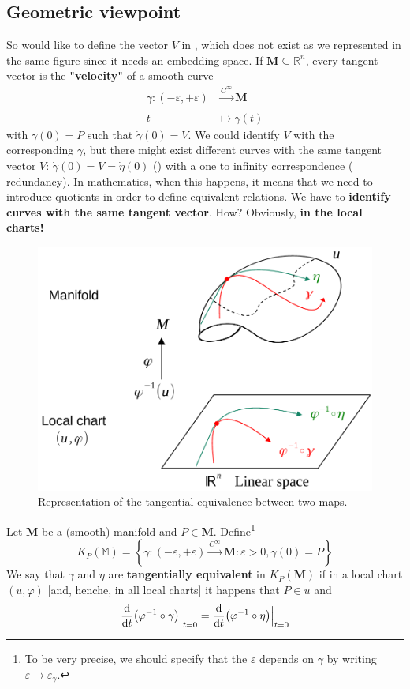 \documentclass[../main.tex]{subfiles}
\begin{document}
\subsection[Geometric viewpoint]{Geometric viewpoint}
So would like to define the vector $V$ in , which does not exist as we represented in the same figure since it needs an embedding space. If $\mathbf{M} \subseteq \mathbb{R}^n$, every tangent vector is the \textbf{"velocity"} of a smooth curve
\[
\begin{split}
\gamma : (-\varepsilon,+\varepsilon)& \xrightarrow[]{C^\infty} \mathbf{M}\\
t &\mapsto \gamma(t)
\end{split}
\] with $\gamma(0)=P$ such that $\Dot{\gamma}(0)=V$. We could identify $V$ with the corresponding $\gamma$, but there might exist different curves with the same tangent vector $V$: $\Dot{\gamma}(0)=V=\Dot{\eta}(0)$ () with a one to infinity correspondence ({\selectfont{}\relax} redundancy). In mathematics, when this happens, it means that we need to introduce quotients in order to define equivalent relations. We have to \textbf{identify curves with the same tangent vector}. How? Obviously, \textbf{in the local charts!} 
\begin{figure}[H]
	\includegraphics{images/tan_equiv.pdf}
	\caption[Tangential equivalence]{Representation of the tangential equivalence between two maps.}
\end{figure} 
\begin{definition}
Let $\mathbf{M}$ be a (smooth) manifold and $P \in \mathbf{M}$. Define\footnote{To be very precise, we should specify that the $\varepsilon$ depends on $\gamma$ by writing $\varepsilon \to \varepsilon_\gamma$.}
\[
K_P(\mathbb{M})=\left\{\gamma:(-\varepsilon,+\varepsilon)\xrightarrow[]{C^\infty}\mathbf{M}:\varepsilon>0, \gamma(0)=P \right\}
\]
We say that $\gamma$ and $\eta$ are \textbf{tangentially equivalent} in $K_P(\mathbf{M})$ if in a local chart $(u,\varphi)$ [and, henche, in all local charts] it happens that $P \in u$ and
\[
\dv{t}(\varphi^{-1}\circ \gamma)\Bigr|_{\substack{t=0}}=\dv{t}(\varphi^{-1}\circ \eta)\Bigr|_{\substack{t=0}}
\]
\end{definition}
\end{document}
